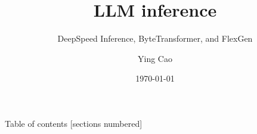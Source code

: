 \documentclass[10pt,xcolor=dvipsnames]{beamer}
\title{LLM inference}
\subtitle{DeepSpeed Inference, ByteTransformer, and FlexGen}
\date{\today}
\author{Ying Cao}
\institute{}
\begin{document}
\maketitle

\begin{frame}{Table of contents}
  [sections numbered]
  \tableofcontents%
\end{frame}





\end{document}
